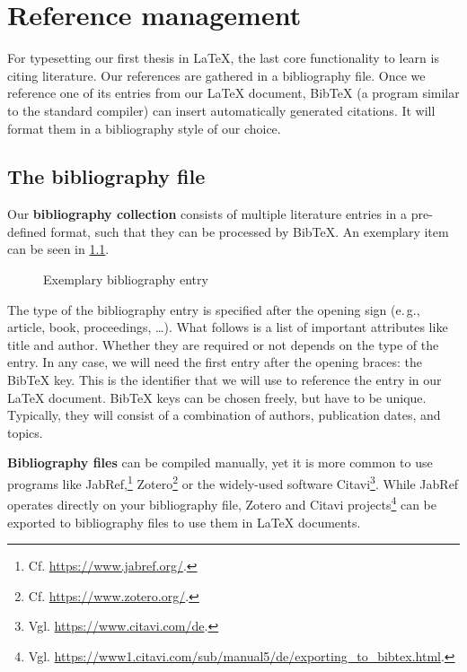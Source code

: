 \chapter{Reference management}
\label{sec:literature}

For typesetting our first thesis in \LaTeX{}, the last core functionality to learn is citing literature.
Our references are gathered in a bibliography file.
Once we reference one of its entries from our \LaTeX{} document, Bib\TeX{} (a 
program similar to the standard  compiler)
can insert automatically generated citations.
It will format them in a bibliography style of our choice.

\section{The bibliography file}
Our \textbf{bibliography collection} consists of multiple literature entries in a pre-defined format, such that they can be processed by Bib\TeX{}.
An exemplary item can be seen in \cref{lst:bibfile-sample-entry}.

\begin{figure}[H]

  \caption{Exemplary bibliography entry}
  \label{lst:bibfile-sample-entry}
\end{figure}

The type of the bibliography entry is specified after the opening  sign (e.\,g., article, book, proceedings, …).
What follows is a list of important attributes like title and author.
Whether they are required or not depends on the type of the entry.
In any case, we will need the first entry after the opening braces: the Bib\TeX{} key.
This is the identifier that we will use to reference the entry in our \LaTeX{} document.
Bib\TeX{} keys can be chosen freely, but have to be unique.
Typically, they will consist of a combination of authors, publication dates, and topics.

\textbf{Bibliography files} can be compiled manually, yet it is more common to use programs like JabRef,\footnote{Cf. \url{https://www.jabref.org/}.} Zotero\footnote{Cf. \url{https://www.zotero.org/}.} or the widely-used software Citavi\footnote{Vgl. \url{https://www.citavi.com/de}.}.
While JabRef operates directly on your bibliography file, Zotero and Citavi projects\footnote{Vgl. \url{https://www1.citavi.com/sub/manual5/de/exporting_to_bibtex.html}.} can be exported to bibliography files to use them in \LaTeX{} documents.

